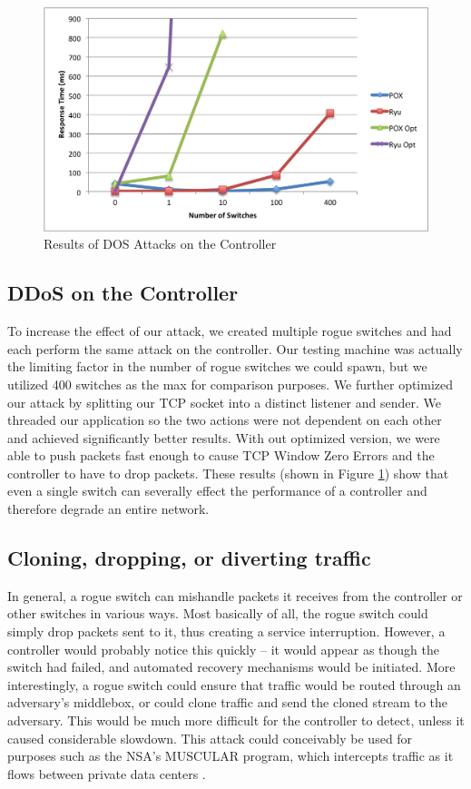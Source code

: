 \begin{figure}[ht]
  \includegraphics[width=\linewidth]{DOSAttack.png}
  \caption{Results of DOS Attacks on the Controller \cite{protocol}}
  \label{fig:DOSattacks}
\end{figure}

\subsection{DDoS on the Controller}
   To increase the effect of our attack, we created multiple rogue switches and had each perform the same attack on the controller. Our testing machine was actually the limiting factor in the number of rogue switches we could spawn, but we utilized 400 switches as the max for comparison purposes.  We further optimized our attack by splitting our TCP socket into a distinct listener and sender. We threaded our application so the two actions were not dependent on each other and achieved significantly better results. With out optimized version, we were able to push packets fast enough to cause TCP Window Zero Errors and the controller to have to drop packets.  These results (shown in Figure \ref{fig:DOSattacks}) show that even a single switch can severally effect the performance of a controller and therefore degrade an entire network. 

\subsection{Cloning, dropping, or diverting traffic}

In general, a rogue switch can mishandle packets it receives from the controller or other switches in various ways. Most basically of all, the rogue switch could simply drop packets sent to it, thus creating a service interruption. However, a controller would probably notice this quickly -- it would appear as though the switch had failed, and automated recovery mechanisms would be initiated. More interestingly, a rogue switch could ensure that traffic would be routed through an adversary's middlebox, or could clone traffic and send the cloned stream to the adversary. This would be much more difficult for the controller to detect, unless it caused considerable slowdown. This attack could conceivably be used for purposes such as the NSA's MUSCULAR program, which intercepts traffic as it flows between private data centers \cite{muscular}. 


